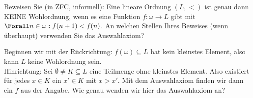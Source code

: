 
\begin{exercise}[286]

Beweisen Sie (in ZFC, informell):
Eine lineare Ordnung $(L, <)$ ist genau dann KEINE Wohlordnung, wenn es eine Funktion $f: \omega \to L$ gibt mit $\Forall n \in \omega: f(n + 1) < f(n)$.
An welchen Stellen Ihres Beweises (wenn überhaupt) verwenden Sie das Auswahlaxiom?

\end{exercise}


\begin{solution}

Beginnen wir mit der Rückrichtung: $f(\omega) \subseteq L$ hat kein kleinstes
Element, also kann $L$ keine Wohlordnung sein. \\
Hinrichtung: Sei $\emptyset \neq K \subseteq L$ eine Teilmenge ohne kleinstes Element.
Also existiert für jedes $x \in K$ ein $x' \in K$ mit $x > x'$.
Mit dem Auswahlaxiom finden wir dann ein $f$ aus der Angabe. Wie genau wenden
wir hier das Auswahlaxiom an?

\end{solution}


